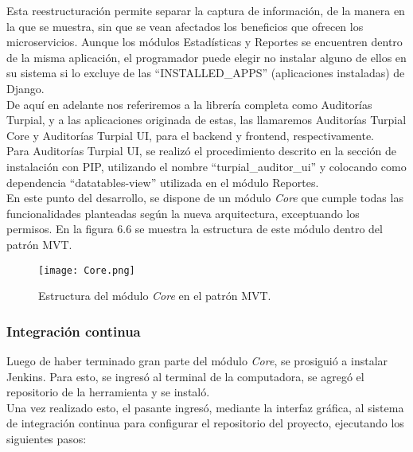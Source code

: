 Esta reestructuración permite separar la captura de información, de la manera en la que se muestra, sin que se vean afectados los beneficios que ofrecen los microservicios. Aunque los módulos Estadísticas y Reportes se encuentren dentro de la misma aplicación, el programador puede elegir no instalar alguno de ellos en su sistema si lo excluye de las “INSTALLED\_APPS” (aplicaciones instaladas) de Django.\\

De aquí en adelante nos referiremos a la librería completa como Auditorías Turpial, y a las aplicaciones originada de estas, las llamaremos Auditorías Turpial Core y Auditorías Turpial UI, para el backend y frontend, respectivamente.\\

Para Auditorías Turpial UI, se realizó el procedimiento descrito en la sección de instalación con PIP, utilizando el nombre “turpial\_auditor\_ui” y colocando como dependencia “datatables-view” utilizada en el módulo Reportes.\\

En este punto del desarrollo, se dispone de un módulo \textit{Core} que cumple todas las funcionalidades planteadas según la nueva arquitectura, exceptuando los permisos. En la figura 6.6 se muestra la estructura de este módulo dentro del patrón MVT.

\begin{figure}[h]
\centering
\texttt{[image: Core.png]}
\caption{Estructura del módulo \textit{Core} en el patrón MVT.}
\label{fig:figura6.6}
\end{figure}

\subsubsection{Integración continua}

Luego de haber terminado gran parte del módulo \textit{Core}, se prosiguió a instalar Jenkins. Para esto, se ingresó al terminal de la computadora, se agregó el repositorio de la herramienta y se instaló.\\

Una vez realizado esto, el pasante ingresó, mediante la interfaz gráfica, al sistema de integración continua para configurar el repositorio del proyecto, ejecutando los siguientes pasos:

